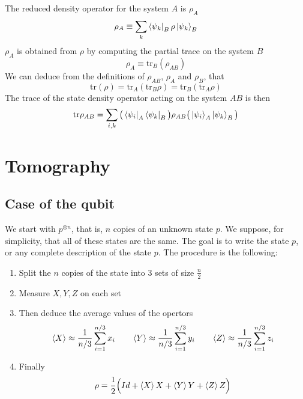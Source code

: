 \documentclass{article}
\begin{document}
The reduced density operator for the system $A$ is $\rho_A$
\begin{equation}
    \rho_A \equiv
    \sum_k \bra{\psi_k}_B\rho\ket{\psi_k}_B
\end{equation}
$\rho_A$ is obtained from $\rho$ by computing the partial
trace on the system $B$
\begin{equation}
    \rho_A \equiv \text{tr}_B(\rho_{AB})
\end{equation}
We can deduce from the definitions of $\rho_{AB}$, $\rho_A$ and $\rho_B$, that
\begin{equation}
    \text{tr}(\rho) = \text{tr}_A(\text{tr}_B\rho) =
    \text{tr}_B(\text{tr}_A\rho)
\end{equation}
The trace of the state density operator acting on the system $AB$ is then
\begin{equation}
    \text{tr}\rho_{AB} =
    \sum_{i,k} \big(\bra{\psi_i}_A\bra{\psi_k}_B\big)\rho_{AB}\big(\ket{\psi_i}_A\ket{\psi_k}_B\big)
\end{equation}

\section{Tomography}
\subsection{Case of the qubit}
We start with $p^{\otimes n}$, that is, $n$ copies of an unknown state $p$.
We suppose, for simplicity, that all of these states are the same.
The goal is to write the state $p$, or any complete description of the state
$p$. The procedure is the following:
\begin{enumerate}
    \item Split the $n$ copies of the state into 3 sets of size $\frac{n}{2}$
    \item Measure $X, Y, Z$ on each set
    \item Then deduce the average values of the opertors
    \begin{equation}
        \braket{X} \approx \frac{1}{n/3}\sum_{i=1}^{n/3} x_i \qquad
        \braket{Y} \approx \frac{1}{n/3}\sum_{i=1}^{n/3} y_i \qquad
        \braket{Z} \approx \frac{1}{n/3}\sum_{i=1}^{n/3} z_i
    \end{equation}
    \item Finally
    \begin{equation}
        \rho = \frac{1}{2}\Big(Id + \braket{X}X+\braket{Y}Y+ \braket{Z}Z\Big)
    \end{equation}
\end{enumerate}
\end{document}
